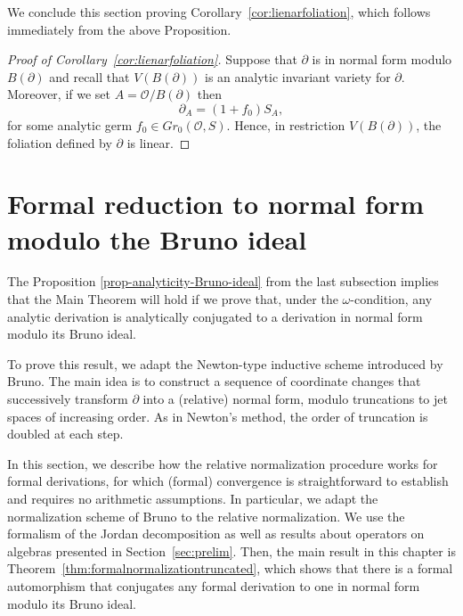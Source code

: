 \documentclass[10pt,twoside,reqno]{amsart}
\theoremstyle{remark}
\theoremstyle{remark}
\newcommand{\OO}{\mathcal{O}}
\begin{document}
We conclude this section proving Corollary~\ref{cor:lienarfoliation}, which follows immediately from the above Proposition. 
\begin{proof}
    [Proof of Corollary~\ref{cor:lienarfoliation}]
Suppose that $\partial$ is in normal form modulo $B(\partial)$ and recall that $V(B(\partial))$ is an analytic invariant variety for $\partial$. Moreover, if we set $A=\mathcal O/ B(\partial)$ then 
$$\partial_A = (1+f_0)S_A,$$ 
for some analytic germ $f_0 \in Gr_0(\OO,S)$. Hence, in restriction $V(B(\partial))$, the foliation defined by $\partial$ is linear.
\end{proof}
\section{Formal reduction to normal form modulo the Bruno ideal}\label{sec:formalNormalizationModBruno}
The Proposition \ref{prop-analyticity-Bruno-ideal} from the last subsection implies that the Main Theorem will hold if we prove that, under the $\omega$-condition, any analytic derivation is analytically conjugated to a derivation in normal form modulo its Bruno ideal. 

To prove this result, we adapt the Newton-type inductive scheme introduced by Bruno. The main idea is to construct a sequence of coordinate changes that successively transform $\partial$ into a (relative) normal form, modulo truncations to jet spaces of increasing order. As in Newton’s method, the order of truncation is doubled at each step.

In this section, we describe how the relative normalization procedure works for formal derivations, for which (formal) convergence is straightforward to establish and requires no arithmetic assumptions. In particular, we adapt the normalization scheme of Bruno to the relative normalization. We use the formalism of the Jordan decomposition as well as results about operators on algebras presented in Section~\ref{sec:prelim}. Then, the main result in this chapter is Theorem~\ref{thm:formalnormalizationtruncated}, which shows that there is a formal automorphism that conjugates any formal derivation to one in normal form modulo its Bruno ideal.
\end{document}
